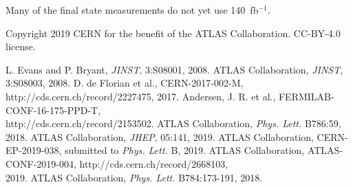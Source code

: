 \documentclass{moriond}
\begin{document}
Many of the final state measurements do not yet use 140~fb$^{-1}$.

\phantom{.}

\noindent
Copyright 2019 CERN for the benefit of the ATLAS Collaboration. CC-BY-4.0 license.

\begin{thebibliography}{99}
 L. Evans and P. Bryant, {\em JINST}, 3:S08001, 2008.
 ATLAS Collaboration, {\em JINST}, 3:S08003, 2008.
 D. de Florian et al., CERN-2017-002-M, http://cds.cern.ch/record/2227475, 2017.
 Andersen, J. R. et al., FERMILAB-CONF-16-175-PPD-T,\\ http://cds.cern.ch/record/2153502.
 ATLAS Collaboration, {\em Phys. Lett.} B786:59, 2018.
 ATLAS Collaboration, {\em JHEP}, 05:141, 2019.
 ATLAS Collaboration, CERN-EP-2019-038, submitted to {\em Phys. Lett.} B, 2019.
 ATLAS Collaboration, ATLAS-CONF-2019-004, http://cds.cern.ch/record/2668103,\\ 2019.
 ATLAS Collaboration, {\em Phys. Lett.} B784:173-191, 2018.
\end{thebibliography}


\end{document}
